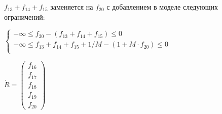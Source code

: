\begin{enumerate}
  $f_{13} + f_{14} + f_{15}$ заменяется на $f_{20}$ с добавлением в моделе следующих ограничений:
  \begin{center}
    $
      \begin{cases}
        -\infty \le f_{20} - (f_{13} + f_{14} + f_{15}) \le 0 \\ %
        -\infty \le f_{13} + f_{14} + f_{15} + 1 / M - (1 + M \cdot f_{20}) \le 0 \\ %
      \end{cases}
    $
  \end{center}
  \begin{center}
    $
      \dot{R} = \begin{pmatrix}
        f_{16} \\ 
        f_{17} \\
        f_{18} \\
        f_{19} \\
        f_{20}
      \end{pmatrix}
    $
  \end{center}


\end{enumerate}
